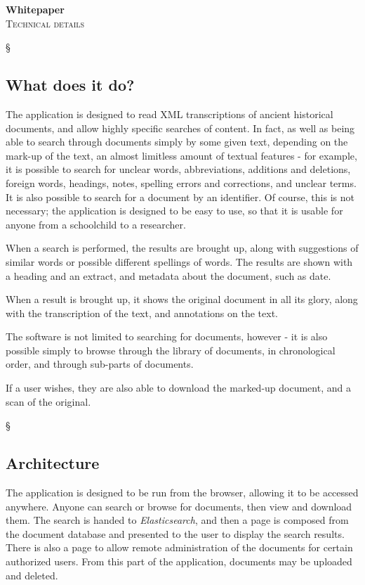 \documentclass[12pt,a4paper]{report}
\newcommand{\newsection}[1]{\begin{center}\bigskip\S\\\bigskip\end{center}\begin{flushright}\section*{#1}\end{flushright}}
\begin{document}
    
    \begin{flushright}
        {\Huge \textbf{Whitepaper}}\\
    {\Large \textsc{Technical details}}
    \end{flushright}
    
    \newsection{What does it do?}
    
    The application is designed to read XML transcriptions of ancient historical documents, and allow highly specific searches of content. In fact, as well as being able to search through documents simply by some given text, depending on the mark-up of the text, an almost limitless amount of textual features - for example, it is possible to search for unclear words, abbreviations, additions and deletions, foreign words, headings, notes, spelling errors and corrections, and unclear terms. It is also possible to search for a document by an identifier. Of course, this is not necessary; the application is designed to be easy to use, so that it is usable for anyone from a schoolchild to a researcher.
    
    When a search is performed, the results are brought up, along with suggestions of similar words or possible different spellings of words. The results are shown with a heading and an extract, and metadata about the document, such as date.
    
    When a result is brought up, it shows the original document in all its glory, along with the transcription of the text, and annotations on the text.
    
    The software is not limited to searching for documents, however - it is also possible simply to browse through the library of documents, in chronological order, and through sub-parts of documents.
    
    If a user wishes, they are also able to download the marked-up document, and a scan of the original.
    
    \newsection{Architecture}
    
    The application is designed to be run from the browser, allowing it to be accessed anywhere. Anyone can search or browse for documents, then view and download them. The search is handed to \emph{Elasticsearch}, and then a page is composed from the document database and presented to the user to display the search results. There is also a page to allow remote administration of the documents for certain authorized users. From this part of the application, documents may be uploaded and deleted.
    
\end{document}
